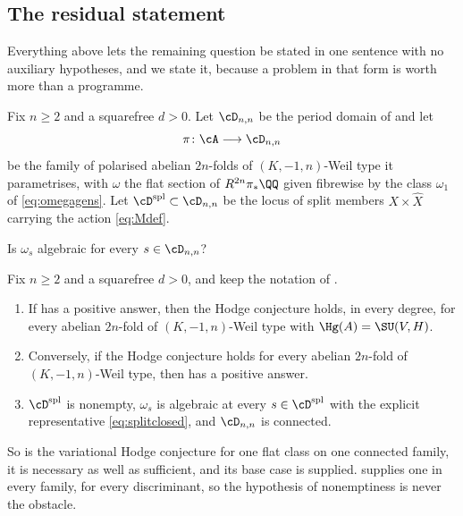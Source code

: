 \subsection{The residual statement}\label{ssec:residual}

Everything above lets the remaining question be stated in one sentence with no
auxiliary hypotheses, and we state it, because a problem in that form is
worth more than a programme.

\begin{setupenv}\label{setup:family}
Fix $n\ge2$ and a squarefree $d>0$. Let $\cD_{n,n}$ be the period domain of
 and let
\[
  \pi\colon\cA\longrightarrow\cD_{n,n}
\]
be the family of polarised abelian $2n$-folds of $(K,-1,n)$-Weil type it
parametrises, with $\omega$ the flat section of $R^{2n}\pi_{*}\QQ$ given
fibrewise by the class $\omega_{1}$ of \eqref{eq:omegagens}. Let
$\cD^{\mathrm{spl}}\subset\cD_{n,n}$ be the locus of split members
$X\times\widehat{X}$ carrying the action \eqref{eq:Mdef}.
\end{setupenv}

\begin{question}\label{q:residual}
Is $\omega_{s}$ algebraic for every $s\in\cD_{n,n}$?
\end{question}

\begin{theorem}\label{thm:residual}
Fix $n\ge2$ and a squarefree $d>0$, and keep the notation of
.
\begin{enumerate}[label=\textup{(\alph*)},nosep]
\item If  has a positive answer, then the Hodge conjecture
  holds, in every degree, for every abelian $2n$-fold of $(K,-1,n)$-Weil type
  with $\Hg(A)=\SU(V,H)$.
\item Conversely, if the Hodge conjecture holds for every abelian $2n$-fold of
  $(K,-1,n)$-Weil type, then  has a positive answer.
\item $\cD^{\mathrm{spl}}$ is nonempty, $\omega_{s}$ is algebraic at every
  $s\in\cD^{\mathrm{spl}}$ with the explicit representative
  \eqref{eq:splitclosed}, and $\cD_{n,n}$ is connected.
\end{enumerate}
So  is the variational Hodge conjecture for one flat class on
one connected family, it is necessary as well as sufficient, and its base case
is supplied.  supplies one in every family, for every
discriminant, so the hypothesis of nonemptiness is never the obstacle.
\end{theorem}

